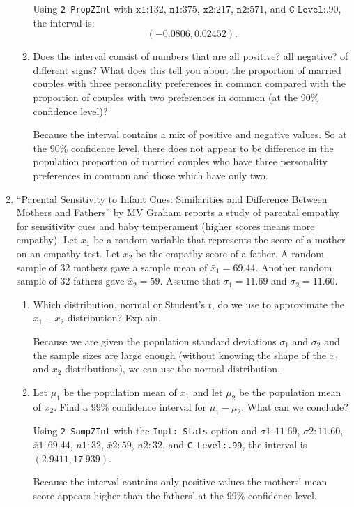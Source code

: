 \documentclass{article}
\newcommand{\answer}[1]{\color{red}#1}
\begin{document}
\begin{enumerate}
\begin{enumerate}
	{\answer Using \texttt{2-PropZInt} with $\texttt{x1:} 132$, $\texttt{n1:}375$, $\texttt{x2:} 217$, $\texttt{n2:} 571$, and $\texttt{C-Level:} .90$, the interval is: $$(-0.0806, 0.02452).$$
	}  
	
	\item Does the interval consist of numbers that are all positive? all negative? of different signs? What does this tell you about the proportion of married couples with three personality preferences in common compared with the proportion of couples with two preferences in common (at the 90\% confidence level)?  
	
	{\answer Because the interval contains a mix of positive and negative values. So at the 90\% confidence level, there does not appear to be difference in the population proportion of married couples who have three personality preferences in common and those which have only two.
	}  
	\end{enumerate}
	

\item ``Parental Sensitivity to Infant Cues: Similarities and Difference Between Mothers and Fathers'' by MV Graham reports a study of parental empathy for sensitivity cues and baby temperament (higher scores means more empathy). Let $x_1$ be a random variable that represents the score of a mother on an empathy test. Let $x_2$ be the empathy score of a father. A random sample of 32 mothers gave a sample mean of $\bar{x}_1 = 69.44$. Another random sample of 32 fathers gave $\bar{x}_2 = 59$. Assume that $\sigma_1=11.69$ and $\sigma_2 = 11.60$.
	\begin{enumerate}
	\item Which distribution, normal or Student's $t$, do we use to approximate the $x_1-x_2$ distribution? Explain.  
	
	{\answer Because we are given the population standard deviations $\sigma_1$ and $\sigma_2$ and the sample sizes are large enough (without knowing the shape of the $x_1$ and $x_2$ distributions), we can use the normal distribution.
	}  
	
	\item Let $\mu_1$ be the population mean of $x_1$ and let $\mu_2$ be the population mean of $x_2$. Find a 99\% confidence interval for $\mu_1-\mu_2$. What can we conclude? 
	
	{\answer Using \texttt{2-SampZInt} with the \texttt{Inpt: Stats} option and $\sigma1: 11.69$, $\sigma2: 11.60$, $\bar{x}1: 69.44$, $n1: 32$, $\bar{x}2: 59$, $n2: 32$, and \texttt{C-Level:.99}, the interval is $(2.9411,17.939)$.  
	
	Because the interval contains only positive values the mothers' mean score appears higher than the fathers' at the 99\% confidence level.
	}  
	\end{enumerate}

\end{enumerate}

\vfill
\end{document}
